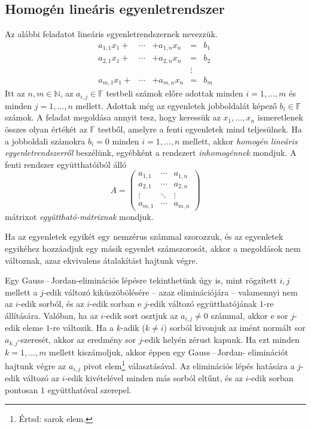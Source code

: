 \documentclass[a4paper, showtrims]{memoir}
\theoremstyle{plain}
\theoremstyle{remark}
\theoremstyle{definition}
\begin{document}
\subsection{Homogén lineáris egyenletrendszer}
Az alábbi feladatot lineáris egyenletrendszernek nevezzük.
\[
	\begin{array}{rrlcl}
		a_{1,1}x_1+ & \cdots & +a_{1,n}x_n & =      & b_1 \\
		a_{2,1}x_1+ & \cdots & +a_{2,n}x_n & =      & b_2 \\
		            &        &             & \vdots &     \\
		a_{m,1}x_1+ & \cdots & +a_{m,n}x_n & =      & b_m
	\end{array}
\]
Itt az $n,m\in\mathbb{N}$, az $a_{i,j}\in\mathbb{F}$ testbeli számok előre adottak
minden $i=1,\ldots,m$ és minden $j=1,\ldots,n$ mellett.
Adottak még az egyenletek jobboldalát képező $b_i\in\mathbb{F}$ számok.
A feladat megoldása annyit tesz, hogy keressük az $x_1,\ldots,x_n$ ismeretlenek
összes olyan értékét az $\mathbb{F}$ testből,
amelyre a fenti egyenletek mind teljesülnek.
Ha a jobboldali számokra $b_i=0$ minden $i=1,\ldots,n$ mellett,
akkor
\emph{homogén lineáris egyenletrendszerről}%
beszélünk,
egyébként a rendszert
\emph{inhomogénnek}%
mondjuk.
A fenti rendszer együtthatóiból álló
\[
	A=
	\begin{pmatrix}
		a_{1,1} & \cdots & a_{1,n} \\
		a_{2,1} & \cdots & a_{2,n} \\
		\vdots  & \ddots & \vdots  \\
		a_{m,1} & \cdots & a_{m,n}
	\end{pmatrix}
\]
mátrixot
\emph{együttható-mátrixnak}%
mondjuk.

Ha az egyenletek egyikét egy nemzérus számmal szorozzuk,
és az egyenletek egyikéhez hozzáadjuk egy másik egyenlet számszorosát,
akkor a megoldások nem változnak,
azaz ekvivalens átalakítást hajtunk végre.

Egy Gauss\,--\,Jordan-eliminációs  lépésre tekinthetünk úgy is,
mint rögzített $i,j$ mellett a $j$-edik változó kiküszöbölésére
-- azaz eliminációjára --
valamennyi nem az $i$-edik sorból,
és az $i$-edik sorban e $j$-edik változó együtthatójának $1$-re állítására.
Valóban,
ha az $i$-edik sort osztjuk az $a_{i,j}\neq 0$ számmal, akkor e sor $j$-edik
eleme $1$-re változik.
Ha a $k$-adik ($k\neq i$) sorból kivonjuk az imént normált sor
$a_{k,j}$-szeresét, akkor az eredmény sor $j$-edik helyén zérust kapunk.
Ha ezt minden $k=1,\ldots,m$ mellett kiszámoljuk, akkor éppen egy Gauss\,--\,Jordan-%
eliminációt hajtunk végre az $a_{i,j}$ pivot elem\footnote{Értsd: sarok elem.} választásával.
Az eliminációs lépés hatására a $j$-edik változó az $i$-edik kivételével
minden más sorból eltűnt, és az $i$-edik sorban pontosan $1$ együtthatóval szerepel.
\end{document}
